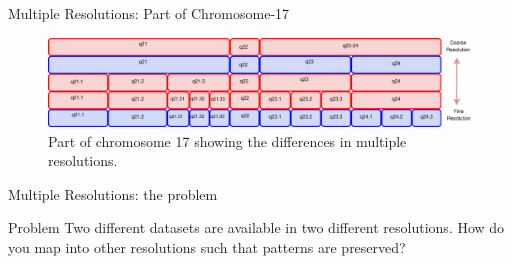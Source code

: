 \documentclass[dvips]{beamer}
\begin{document}
\begin{frame}{Multiple Resolutions: Part of Chromosome-17}
\begin{figure}
\includegraphics [scale = 0.24]{figures/mulres}
\caption{Part of chromosome 17 showing the differences in multiple resolutions.}
\end{figure}
\end{frame}


\begin{frame}{Multiple Resolutions: the problem}
\begin {alertblock}{Problem}
 Two different datasets are available in two different resolutions. How do you map into other resolutions such that patterns are preserved?  
\end {alertblock}
\end{frame}
\end{document}

